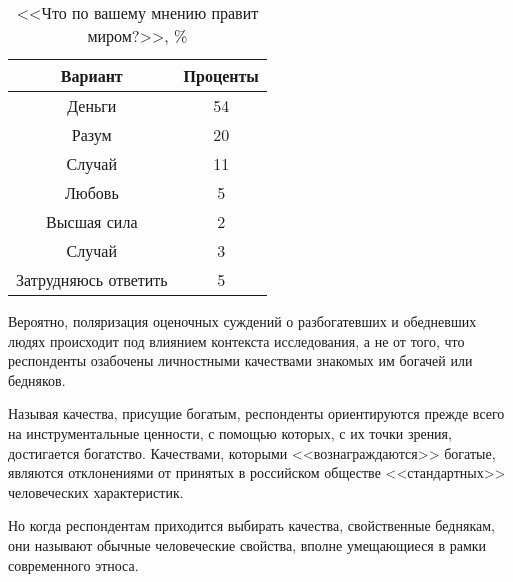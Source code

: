 \begin{table}[H]
    \centering
    \begin{tabular}{|c|c|}
        \hline
        Вариант & Проценты \\ \hline \hline
        Деньги & 54 \\ \hline
        Разум & 20 \\ \hline
        Случай & 11 \\ \hline
        Любовь & 5 \\ \hline
        Высшая сила & 2 \\ \hline
        Случай & 3 \\ \hline
        Затрудняюсь ответить & 5 \\ \hline
    \end{tabular}
    \caption{<<Что по вашему мнению правит миром?>>, \%}
\end{table}

Вероятно, поляризация оценочных суждений о разбогатевших и обедневших людях 
происходит под влиянием контекста исследования, а не от того, что респонденты 
озабочены личностными качествами знакомых им богачей или бедняков. 

Называя качества, присущие богатым, респонденты ориентируются прежде всего 
на инструментальные ценности, с помощью которых, с их точки зрения, достигается 
богатство. Качествами, которыми <<вознаграждаются>> богатые, являются 
отклонениями от принятых в российском обществе <<стандартных>> человеческих 
характеристик. 

Но когда респондентам приходится выбирать качества, свойственные беднякам, они 
называют обычные человеческие свойства, вполне умещающиеся в рамки современного 
этноса.

